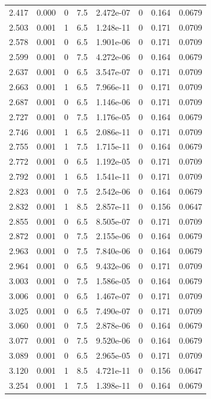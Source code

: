\documentclass[preview]{standalone}
\begin{document}
{{{\begin{tabular}{L{1.2cm}C{1.2cm} C{0.3cm}C{0.5cm} C{1.4cm}C{1.4cm} C{1.4cm}C{1.4cm}}
  2.417  &  0.000  & 0     & 7.5 &  2.472e-07  & 0  & 0.164 &  0.0679   \\ 
  2.503  &  0.001  & 1     & 6.5 &  1.248e-11  & 0  & 0.171 &  0.0709   \\ 
  2.578  &  0.001  & 0     & 6.5 &  1.901e-06  & 0  & 0.171 &  0.0709   \\ 
  2.599  &  0.001  & 0     & 7.5 &  4.272e-06  & 0  & 0.164 &  0.0679   \\ 
  2.637  &  0.001  & 0     & 6.5 &  3.547e-07  & 0  & 0.171 &  0.0709   \\ 
  2.663  &  0.001  & 1     & 6.5 &  7.966e-11  & 0  & 0.171 &  0.0709   \\ 
  2.687  &  0.001  & 0     & 6.5 &  1.146e-06  & 0  & 0.171 &  0.0709   \\ 
  2.727  &  0.001  & 0     & 7.5 &  1.176e-05  & 0  & 0.164 &  0.0679   \\ 
  2.746  &  0.001  & 1     & 6.5 &  2.086e-11  & 0  & 0.171 &  0.0709   \\ 
  2.755  &  0.001  & 1     & 7.5 &  1.715e-11  & 0  & 0.164 &  0.0679   \\ 
  2.772  &  0.001  & 0     & 6.5 &  1.192e-05  & 0  & 0.171 &  0.0709   \\ 
  2.792  &  0.001  & 1     & 6.5 &  1.541e-11  & 0  & 0.171 &  0.0709   \\ 
  2.823  &  0.001  & 0     & 7.5 &  2.542e-06  & 0  & 0.164 &  0.0679   \\ 
  2.832  &  0.001  & 1     & 8.5 &  2.857e-11  & 0  & 0.156 &  0.0647   \\ 
  2.855  &  0.001  & 0     & 6.5 &  8.505e-07  & 0  & 0.171 &  0.0709   \\ 
  2.872  &  0.001  & 0     & 7.5 &  2.155e-06  & 0  & 0.164 &  0.0679   \\ 
  2.963  &  0.001  & 0     & 7.5 &  7.840e-06  & 0  & 0.164 &  0.0679   \\ 
  2.964  &  0.001  & 0     & 6.5 &  9.432e-06  & 0  & 0.171 &  0.0709   \\ 
  3.003  &  0.001  & 0     & 7.5 &  1.586e-05  & 0  & 0.164 &  0.0679   \\ 
  3.006  &  0.001  & 0     & 6.5 &  1.467e-07  & 0  & 0.171 &  0.0709   \\ 
  3.025  &  0.001  & 0     & 6.5 &  7.490e-07  & 0  & 0.171 &  0.0709   \\ 
  3.060  &  0.001  & 0     & 7.5 &  2.878e-06  & 0  & 0.164 &  0.0679   \\ 
  3.077  &  0.001  & 0     & 7.5 &  9.520e-06  & 0  & 0.164 &  0.0679   \\ 
  3.089  &  0.001  & 0     & 6.5 &  2.965e-05  & 0  & 0.171 &  0.0709   \\ 
  3.120  &  0.001  & 1     & 8.5 &  4.721e-11  & 0  & 0.156 &  0.0647   \\ 
  3.254  &  0.001  & 1     & 7.5 &  1.398e-11  & 0  & 0.164 &  0.0679   \\ 
\hline 
\end{tabular} 

}}}
\end{document}
